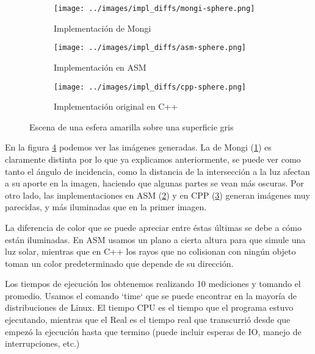 \begin{figure}
    \centering
    \begin{subfigure}[b]{0.45\textwidth}
        \centering
        \texttt{[image: ../images/impl\_diffs/mongi-sphere.png]}
        \caption{Implementación de Mongi}
        \label{fig:yellow-sphere-mongi}
    \end{subfigure}
    \hfill
    \begin{subfigure}[b]{0.45\textwidth}
        \centering
        \texttt{[image: ../images/impl\_diffs/asm-sphere.png]}
        \caption{Implementación en ASM}
        \label{fig:yellow-sphere-asm}
    \end{subfigure}
    \hfill
    \begin{subfigure}[b]{0.45\textwidth}
        \centering
        \texttt{[image: ../images/impl\_diffs/cpp-sphere.png]}
        \caption{Implementación original en C++}
        \label{fig:yellow-sphere-cpp}
    \end{subfigure}

    \caption{Escena de una esfera amarilla sobre una superficie gris}
    \label{fig:yellow-sphere}
\end{figure}

En la figura \ref{fig:yellow-sphere} podemos ver las imágenes generadas. La de
Mongi (\ref{fig:yellow-sphere-mongi}) es claramente distinta por lo que ya
explicamos anteriormente, se puede ver como tanto el ángulo de incidencia, como
la distancia de la intersección a la luz afectan a su aporte en la imagen,
haciendo que algunas partes se vean más oscuras. Por otro lado, las
implementaciones en ASM (\ref{fig:yellow-sphere-asm}) y en CPP
(\ref{fig:yellow-sphere-cpp}) generan imágenes muy parecidas, y más iluminadas
que en la primer imagen.

La diferencia de color que se puede apreciar entre éstas últimas se debe a cómo
están iluminadas. En ASM usamos un plano a cierta altura para que simule una luz
solar, mientras que en C++ los rayos que no colisionan con ningún objeto toman
un color predeterminado que depende de su dirección.

Los tiempos de ejecución los obtenemos realizando 10 mediciones y tomando el
promedio. Usamos el comando `time` que se puede encontrar en la mayoría de
distribuciones de Linux. El tiempo CPU es el tiempo que el programa estuvo
ejecutando, mientras que el Real es el tiempo real que transcurrió desde que
empezó la ejecución hasta que termino (puede incluir esperas de IO,
manejo de interrupciones, etc.)

